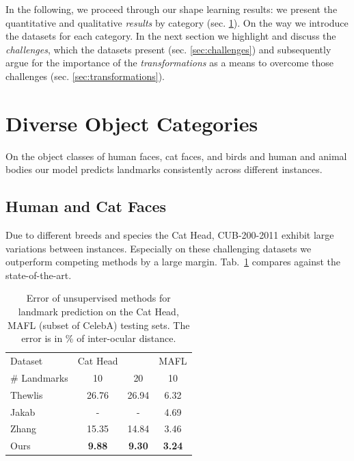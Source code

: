 	In the following, we proceed through our shape learning results: we present the quantitative and qualitative \textit{results} by category (sec. \ref{sec:results}). On the way we introduce the datasets for each category. In the next section we highlight and discuss the \textit{challenges}, which the datasets present (sec. \ref{sec:challenges}) and subsequently argue for the importance of the \textit{transformations} as a means to overcome those challenges (sec. \ref{sec:transformations}).

\section{Diverse Object Categories}\label{sec:results}
	On the object classes of human faces, cat faces, and birds and human and animal bodies our model predicts landmarks consistently across different instances.

	\subsection{Human and Cat Faces}
		Due to different breeds and species the Cat Head, CUB-200-2011 exhibit large variations between instances. Especially on these challenging datasets we outperform competing methods by a large margin.
		Tab.~\ref{tab:faces} compares against the state-of-the-art.
		\begin{table}[t]
			\caption{Error of unsupervised methods for landmark prediction on the Cat Head, MAFL (subset of CelebA) testing sets. The error is in \% of inter-ocular distance.}
			\label{tab:faces}
			\centering
			\begin{tabular}{l|ccc}
			\hline
			Dataset & Cat Head &  & MAFL \\
			  \# Landmarks &10 & 20  & 10  \\
			  \hline
			 Thewlis \cite{thewlis17}
			 & 26.76 & 26.94 & 6.32    \\
			 Jakab \cite{jakab18}
			 & - & - & 4.69  \\
			 Zhang \cite{zhang18}
			 & 15.35 & 14.84 & 3.46  \\
			  Ours & \textbf{9.88}  & \textbf{9.30} & \textbf{3.24}  \\ \hline  %
			\end{tabular}
		\end{table}

